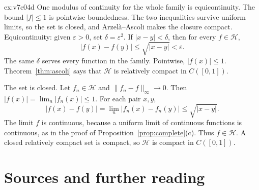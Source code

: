 \begin{solution}{ex:v7c04d}
\idea One modulus of continuity for the whole family is equicontinuity. The bound $|f|\le 1$ is pointwise boundedness. The two inequalities survive uniform limits, so the set is closed, and Arzel\`a--Ascoli makes the closure compact.
\writeup Equicontinuity: given $\varepsilon>0$, set $\delta=\varepsilon^2$. If $|x-y|<\delta$, then for every $f\in\mathcal H$,
\[|f(x)-f(y)|\le\sqrt{|x-y|}<\varepsilon.\]
The same $\delta$ serves every function in the family. Pointwise, $|f(x)|\le 1$. Theorem~\ref{thm:ascoli} says that $\mathcal H$ is relatively compact in $C([0,1])$.

The set is closed. Let $f_n\in\mathcal H$ and $\|f_n-f\|_\infty\to 0$. Then $|f(x)|=\lim_n|f_n(x)|\le 1$. For each pair $x,y$,
\[|f(x)-f(y)|=\lim_n|f_n(x)-f_n(y)|\le\sqrt{|x-y|}.\]
The limit $f$ is continuous, because a uniform limit of continuous functions is continuous, as in the proof of Proposition~\ref{prop:complete}(c). Thus $f\in\mathcal H$. A closed relatively compact set is compact, so $\mathcal H$ is compact in $C([0,1])$.
\end{solution}

\section*{Sources and further reading}

